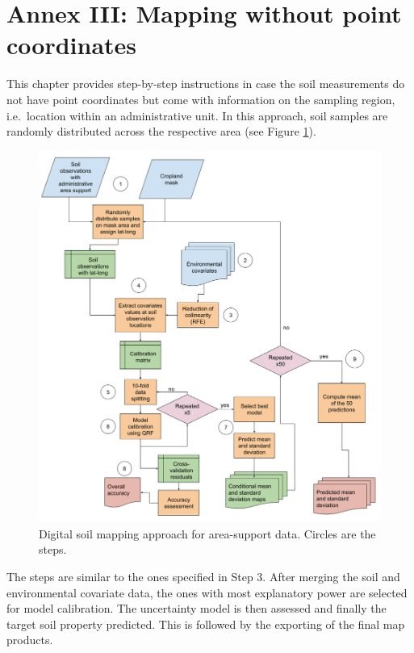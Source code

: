 \documentclass[
  10pt,
  b5paper,
  oneside]{book}
\begin{document}
\hypertarget{annex-iii-mapping-without-point-coordinates}{%
\chapter*{Annex III: Mapping without point coordinates}\label{annex-iii-mapping-without-point-coordinates}}

This chapter provides step-by-step instructions in case the soil measurements do not have point coordinates but come with information on the sampling region, i.e.~location within an administrative unit. In this approach, soil samples are randomly distributed across the respective area (see Figure \ref{fig:workflow2}).

\begin{figure}
\includegraphics[width=16.1in]{images/workflow_county_data} \caption{Digital soil mapping approach for area-support data. Circles are the steps.}\label{fig:workflow2}
\end{figure}

The steps are similar to the ones specified in Step 3. After merging the soil and environmental covariate data, the ones with most explanatory power are selected for model calibration. The uncertainty model is then assessed and finally the target soil property predicted. This is followed by the exporting of the final map products.
\end{document}
